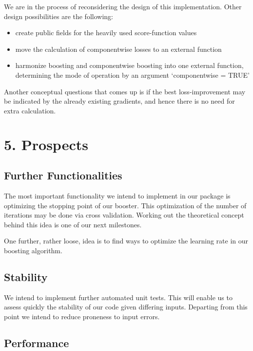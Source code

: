 \documentclass[
]{report}
\providecommand{\tightlist}{%
  \setlength{\itemsep}{0pt}\setlength{\parskip}{0pt}}
\begin{document}
We are in the process of reconsidering the design of this
implementation. Other design possibilities are the following:

\begin{itemize}
\tightlist
\item
  create public fields for the heavily used score-function values
\item
  move the calculation of componentwise losses to an external function
\item
  harmonize boosting and componentwise boosting into one external
  function, determining the mode of operation by an argument
  `componentwise = TRUE'
\end{itemize}

Another conceptual questions that comes up is if the best
loss-improvement may be indicated by the already existing gradients, and
hence there is no need for extra calculation.

\hypertarget{prospects}{%
\chapter{5. Prospects}\label{prospects}}

\hypertarget{further-functionalities}{%
\section{Further Functionalities}\label{further-functionalities}}

The most important functionality we intend to implement in our package
is optimizing the stopping point of our booster. This optimization of
the number of iterations may be done via cross validation. Working out
the theoretical concept behind this idea is one of our next milestones.

One further, rather loose, idea is to find ways to optimize the learning
rate in our boosting algorithm.

\hypertarget{stability}{%
\section{Stability}\label{stability}}

We intend to implement further automated unit tests. This will enable us
to assess quickly the stability of our code given differing inputs.
Departing from this point we intend to reduce proneness to input errors.

\hypertarget{performance}{%
\section{Performance}\label{performance}}
\end{document}
